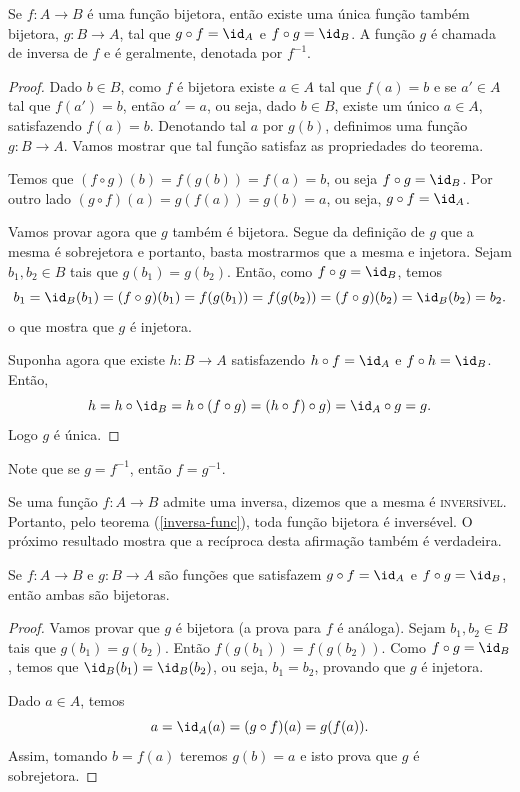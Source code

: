 \documentclass{article}
\begin{document}
\begin{theorem}\label{inversa-func}
Se $f:A \rightarrow B$ \'e uma fun\c{c}\~ao bijetora, ent\~ao existe uma
\'unica fun\c{c}\~ao tamb\'em bijetora, $g:B \rightarrow A$, tal que $g
\circ f = \id_A$ e $f \circ g = \id_B$. A fun\c{c}\~ao $g$ \'e chamada de
inversa de $f$ e \'e geralmente, denotada por $f^{-1}$.
\end{theorem}
\begin{proof}
Dado $b \in B$, como $f$ \'e bijetora existe $a \in A$ tal que
$f(a)=b$ e se $a' \in A$ tal que $f(a')=b$, ent\~ao $a'=a$, ou seja,
dado $b \in B$, existe um \'unico $a \in A$, satisfazendo $f(a)=b$.
Denotando tal $a$ por $g(b)$, definimos uma fun\c{c}\~ao $g:B
\rightarrow A$. Vamos mostrar que tal fun\c{c}\~ao satisfaz as
propriedades do teorema.

Temos que $(f \circ g)(b)=f(g(b))=f(a)=b$, ou seja $f \circ
g=\id_B$. Por outro lado $(g \circ f)(a)=g(f(a))=g(b)=a$, ou seja,
$g \circ f=\id_A$.

Vamos provar agora que $g$ tamb\'em \'e bijetora. Segue da defini\c{c}\~ao
de $g$ que a mesma \'e sobrejetora e portanto, basta mostrarmos que
a mesma e injetora. Sejam $b_1,b_2 \in B$ tais que
$g(b_1)=g(b_2)$. Ent\~ao, como $f \circ g=\id_B$, temos
$$
b_1=\id_B(b_1)=(f \circ g)(b_1)=f(g(b_1))=f(g(b_2))=(f \circ
g)(b_2)=\id_B(b_2)=b_2.
$$
o que mostra que $g$ \'e injetora.

Suponha agora que existe $h:B \rightarrow A$ satisfazendo $h \circ
f = \id_A$ e $f \circ h = \id_B$. Ent\~ao,
$$
h=h \circ \id_B= h \circ (f \circ g)= (h \circ f) \circ g)=\id_A
\circ g= g.
$$
Logo $g$ \'e \'unica.
\end{proof}
\begin{remark}
Note que se $g=f^{-1}$, ent\~ao $f=g^{-1}$.
\end{remark}

Se uma fun\c{c}\~ao $f:A \rightarrow B$ admite uma inversa, dizemos que
a mesma \'e \textsc{invers\'ivel}. Portanto, pelo teorema
(\ref{inversa-func}), toda fun\c{c}\~ao bijetora \'e invers\'evel. O pr\'oximo
resultado mostra que a rec\'iproca desta afirma\c{c}\~ao tamb\'em \'e
verdadeira.

\begin{proposition}\label{comp-bije}
Se $f:A \rightarrow B$ e $g:B \rightarrow A$ s\~ao fun\c{c}\~oes que
satisfazem $g \circ f = \id_A$ e $f \circ g = \id_B$, ent\~ao ambas
s\~ao bijetoras.
\end{proposition}
\begin{proof}
Vamos provar que $g$ \'e bijetora (a prova para $f$ \'e an\'aloga).
Sejam $b_1, b_2 \in B$ tais que $g(b_1)=g(b_2)$. Ent\~ao
$f(g(b_1))=f(g(b_2))$. Como $f \circ g = \id_B$, temos que
$\id_B(b_1)=\id_B(b_2)$, ou seja, $b_1=b_2$, provando que $g$ \'e
injetora.

Dado $a \in A$, temos
$$
a=\id_A(a)=(g \circ f)(a)=g(f(a)).
$$
Assim, tomando $b=f(a)$ teremos $g(b)=a$ e isto prova que $g$ \'e
sobrejetora.
\end{proof}



\singlespacing



\end{document}
